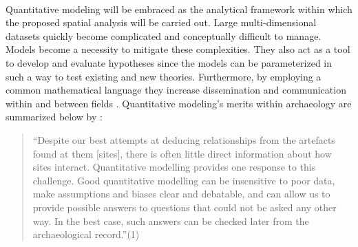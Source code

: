 \documentclass[12pt,a4paper]{thesis}
\begin{document}
\paragraph{}
Quantitative modeling will be embraced as the analytical framework within which the proposed spatial 
analysis will be carried out. Large multi-dimensional datasets quickly become complicated and conceptually difficult to manage. Models become a necessity to mitigate these complexities. They also act as a tool to develop and evaluate hypotheses since the models can be parameterized in such a way to test existing and new theories. Furthermore, by employing a common mathematical language they increase dissemination and communication within and between fields \citep{Wyl09}. Quantitative modeling's merits within archaeology are summarized below by \citep{ERK12}:

\begin{singlespace}
\begin{quote}
        ``Despite our best attempts at deducing relationships from the artefacts found at them [sites], there is often little direct information about how sites interact. Quantitative modelling provides one response to this challenge. Good quantitative modelling can be insensitive to poor data, make assumptions and biases clear and debatable, and can allow us to provide possible answers to questions that could not be asked any other way. In the best case, such answers can be checked later from the archaeological record.''(1)
\end{quote}
\end{singlespace}
\end{document}
